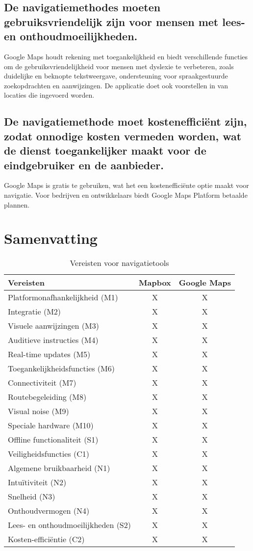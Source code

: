 \subsection*{De navigatiemethodes moeten gebruiksvriendelijk zijn voor mensen met lees- en onthoudmoeilijkheden.}
Google Maps houdt rekening met toegankelijkheid en biedt verschillende functies om de gebruiksvriendelijkheid voor mensen met dyslexie te verbeteren, zoals duidelijke en beknopte tekstweergave, ondersteuning voor spraakgestuurde zoekopdrachten en aanwijzingen. De applicatie doet ook voorstellen in van locaties die ingevoerd worden.
\subsection*{De navigatiemethode moet kostenefficiënt zijn, zodat onnodige kosten vermeden worden, wat de dienst toegankelijker maakt voor de eindgebruiker en de aanbieder.}
Google Maps is gratis te gebruiken, wat het een kostenefficiënte optie maakt voor navigatie. Voor bedrijven en ontwikkelaars biedt Google Maps Platform betaalde plannen.

\section{Samenvatting}
\label{sec:samenvatting}

\begin{table}[ht]
    \centering
    \begin{tabular}{|l|c|c|} \hline
        \textbf{Vereisten} & \textbf{Mapbox} & \textbf{Google Maps} \\ \hline
        Platformonafhankelijkheid (M1) & X & X \\
        Integratie (M2) & X & X \\
        Visuele aanwijzingen (M3) & X & X \\
        Auditieve instructies (M4) & X & X \\
        Real-time updates (M5) & X & X \\
        Toegankelijkheidsfuncties (M6) & X & X \\
        Connectiviteit (M7) & X & X \\
        Routebegeleiding (M8) & X & X \\
        Visual noise (M9) & X & X \\
        Speciale hardware (M10) & X & X \\
        Offline functionaliteit (S1) & X & X \\
        Veiligheidsfuncties (C1) & X & X \\
        Algemene bruikbaarheid (N1) & X & X \\
        Intuïtiviteit (N2) & X & X \\
        Snelheid (N3) & X & X \\
        Onthoudvermogen (N4) & X & X \\
        Lees- en onthoudmoeilijkheden (S2) & X & X \\
        Kosten-efficiëntie (C2) & X & X \\ \hline
    \end{tabular}
    \caption{Vereisten voor navigatietools}
    \label{tab:vereisten voor navigatietools}
\end{table}